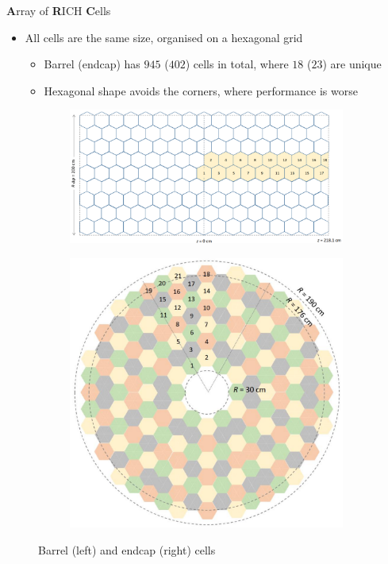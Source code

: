 \documentclass{beamer}
\begin{document}
\begin{frame}{\textbf{A}rray of \textbf{R}ICH \textbf{C}ells}
  \begin{itemize}
    \setlength\itemsep{0.5em}
    \item{All cells are the same size, organised on a hexagonal grid}
    \begin{itemize}
      \item{Barrel (endcap) has $945$ ($402$) cells in total, where $18$ ($23$) are unique}
      \item{Hexagonal shape avoids the corners, where performance is worse}
    \end{itemize}
  \end{itemize}
  \begin{figure}
    \centering
    \begin{subfigure}{0.6\textwidth}
      \includegraphics[width = 1.0\textwidth]{Plots/BarrelCells.png}
    \end{subfigure}%
    \begin{subfigure}{0.3\textwidth}
      \includegraphics[width = 1.0\textwidth]{Plots/EndcapCells.png}
    \end{subfigure}
    \caption{Barrel (left) and endcap (right) cells}
  \end{figure}
\end{frame}
\end{document}

